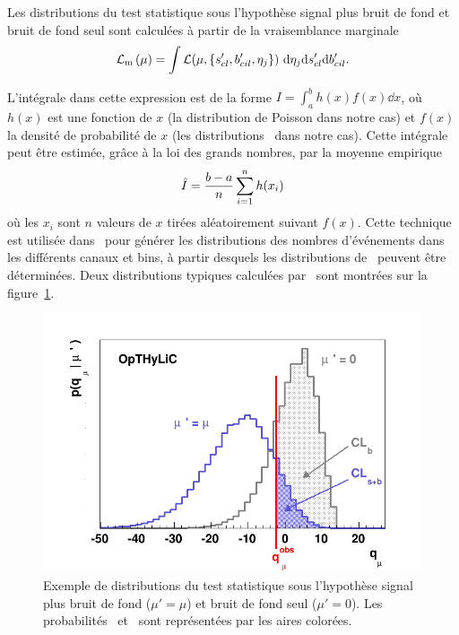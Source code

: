 Les distributions du test statistique sous l'hypoth\`ese signal plus bruit de fond et bruit de fond seul sont calcul\'ees \`a partir de la vraisemblance marginale 
\begin{equation}
\label{eq:LhoodMarginal}
\Lhm\left(\mu\right)=\displaystyle\int\Lh(\mu,\{\scck',\bcik',\eta_j\})~\dd\eta_j\dd\scck'\dd\bcik'.
\end{equation}

L'int\'egrale dans cette expression est de la forme $I=\displaystyle\int_a^b h(x)f(x)\dd x$, o\`u $h(x)$ est une fonction de $x$ (la distribution de Poisson dans notre cas) et $f(x)$ la densit\'e de probabilit\'e de $x$ (les distributions \prior~dans notre cas). Cette int\'egrale peut \^etre estim\'ee, gr\^ace \`a la loi des grands nombres, par la moyenne empirique
\[\hat{I}=\frac{b-a}{n}\sum\limits_{i=1}^{n}h(x_i)\]
o\`u les $x_i$ sont $n$ valeurs de $x$ tir\'ees al\'eatoirement suivant $f(x)$. Cette technique est utilis\'ee dans \opthylic~pour g\'en\'erer les distributions des nombres d'\'ev\'enements dans les diff\'erents canaux et bins, \`a partir desquels les distributions de \qmu~peuvent \^etre d\'etermin\'ees. Deux distributions typiques calcul\'ees par \opthylic~sont montr\'ees sur la figure~\ref{fig:testStatDistribExampleOTH}.

\begin{figure}[!htb]
\begin{center}
\hspace*{-0.6cm}
\includegraphics[scale=0.4]{figures/testStatDistribExample.png}
\caption{Exemple de distributions du test statistique sous l'hypoth\`ese signal plus bruit de fond ($\mu'=\mu$) et bruit de fond seul ($\mu'=0$). Les probabilit\'es \CLsb~et \CLb~sont repr\'esent\'ees par les aires color\'ees.\label{fig:testStatDistribExampleOTH}}
\end{center}
\end{figure}

